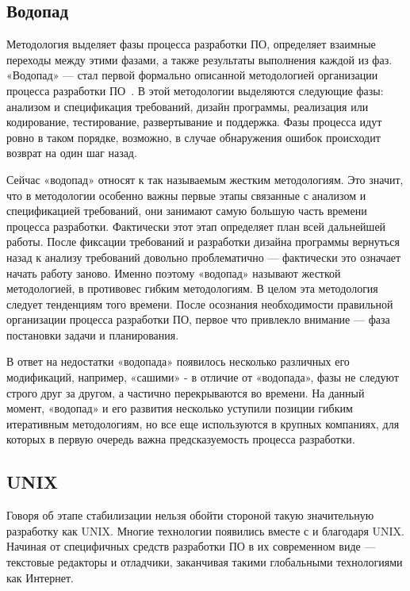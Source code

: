 \subsection{Водопад}

Методология выделяет фазы процесса разработки ПО, определяет взаимные переходы между этими фазами, а также результаты выполнения каждой из фаз. «Водопад» — стал первой формально описанной методологией организации процесса разработки ПО~\cite{Royce:1987:MDL}. В этой методологии выделяются следующие фазы: анализом и спецификация требований, дизайн программы, реализация или кодирование, тестирование, развертывание и поддержка. Фазы процесса идут ровно в таком порядке, возможно, в случае обнаружения ошибок происходит возврат на один шаг назад.

Сейчас «водопад» относят к так называемым жестким методологиям. Это значит, что в методологии особенно важны первые этапы связанные с анализом и спецификацией требований, они занимают самую большую часть времени процесса разработки. Фактически этот этап определяет план всей дальнейшей работы. После фиксации требований и разработки дизайна программы вернуться назад к анализу требований довольно проблематично — фактически это означает начать работу заново. Именно поэтому «водопад» называют жесткой методологией, в противовес гибким методологиям. В целом эта методология следует тенденциям того времени. После осознания необходимости правильной организации процесса разработки ПО, первое что привлекло внимание — фаза постановки задачи и планирования.

В ответ на недостатки «водопада» появилось несколько различных его модификаций, например, «сашими» - в отличие от «водопада», фазы не следуют строго друг за другом, а частично перекрываются во времени. На данный момент, «водопад» и его развития несколько уступили позиции гибким итеративным методологиям, но все еще используются в крупных компаниях, для которых в первую очередь важна предсказуемость процесса разработки.

\subsection{UNIX}

Говоря об этапе стабилизации нельзя обойти стороной такую значительную разработку как UNIX. Многие технологии появились вместе с и благодаря UNIX. Начиная от специфичных средств разработки ПО в их современном виде — текстовые редакторы и отладчики, заканчивая такими глобальными технологиями как Интернет.

